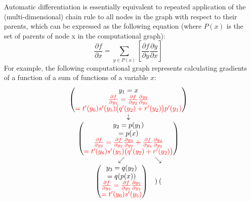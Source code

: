 Automatic differentiation is essentially equivalent to repeated application of the (multi-dimensional) chain rule to all nodes in the graph with respect to their parents, which can be expressed as the following equation (where $P(x)$ is the set of parents of node x in the computational graph):
\begin{equation}
    \frac{\partial f}{\partial x} = \sum_{y\in P(x)}{\left[ \frac{\partial f}{\partial y}\frac{\partial y}{\partial x}\right]}
\end{equation}
For example, the following computational graph represents calculating gradients of a function of a sum of functions of a variable $x$:
\begin{equation*}
    \begin{matrix}
        \begin{pmatrix}
            y_1=x \\
            \color{red}{\frac{\partial f}{\partial y_1} = \frac{\partial f}{\partial y_2}\frac{\partial y_2}{\partial y_1}} \\
            \color{red}{= t'(y_6)s'(y_5)\bigl( q'(y_2) + r'(y_2) \bigr)p'(y_1)}
        \end{pmatrix} \\
        \downarrow \\
        \begin{pmatrix}
            y_2=p(y_1) \\
            =p(x) \\
            \color{red}{\frac{\partial f}{\partial y_2} = \frac{\partial f}{\partial y_3}\frac{\partial y_3}{\partial y_2} + \frac{\partial f}{\partial y_4}\frac{\partial y_4}{\partial y_2}} \\
            \color{red}{= t'(y_6)s'(y_5)\bigl( q'(y_2) + r'(y_2) \bigr)}
        \end{pmatrix} \\
        \begin{matrix}
            \swarrow & \searrow \\
            \begin{pmatrix}
                y_3=q(y_2) \\
                =q(p(x)) \\
                \color{red}{\frac{\partial f}{\partial y_3} = \frac{\partial f}{\partial y_5}\frac{\partial y_5}{\partial y_3}} \\
                \color{red}{= t'(y_6)s'(y_5)}
            \end{pmatrix} &
            \begin{pmatrix}

\end{pmatrix}
\end{matrix}
\end{matrix}
\end{equation*}
